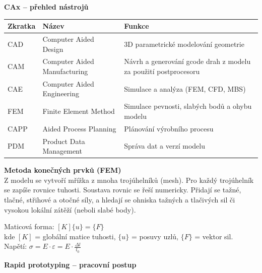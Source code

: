 \documentclass[a4paper,10pt]{article}
\begin{document}
\begin{vysvetlenibox}
\textbf{CAx -- přehled nástrojů}

\begin{center}
\begin{tabularx}{0.95\linewidth}{@{} l l X @{}}
    \toprule
    \textbf{Zkratka} & \textbf{Název} & \textbf{Funkce} \\
    \midrule
    CAD & Computer Aided Design      & 3D parametrické modelování geometrie \\
    CAM & Computer Aided Manufacturing & Návrh a generování gcode drah z modelu za použití postprocesoru\\
    CAE & Computer Aided Engineering & Simulace a analýza (FEM, CFD, MBS) \\
    FEM & Finite Element Method      & Simulace pevnosti, slabých bodů a ohybu modelu \\
    CAPP& Aided Process Planning     & Plánování výrobního procesu \\
    PDM & Product Data Management    & Správa dat a verzí modelu \\
    \bottomrule
\end{tabularx}
\end{center}

\textbf{Metoda konečných prvků (FEM)}\\
Z modelu se vytvoří mřížka z mnoha trojúhelníků (mesh). Pro každý trojúhelník se zapíše
rovnice tuhosti. Soustava rovnic se řeší numericky. Přidají se tažné, tlačné, střihové a otočné síly, a hledají se ohniska tažných a tlačivých sil či vysokou lokální zátěží (neboli slabé body).

\begin{vzorcebox}
Maticová forma: $[K]\{u\} = \{F\}$\\
kde $[K]$ = globální matice tuhosti, $\{u\}$ = posuvy uzlů,
$\{F\}$ = vektor sil.\\
Napětí: $\sigma = E \cdot \varepsilon = E \cdot \frac{\Delta l}{l_0}$
\end{vzorcebox}

\textbf{Rapid prototyping -- pracovní postup}

\begin{center}
\end{center}


\end{vysvetlenibox}
\end{document}
